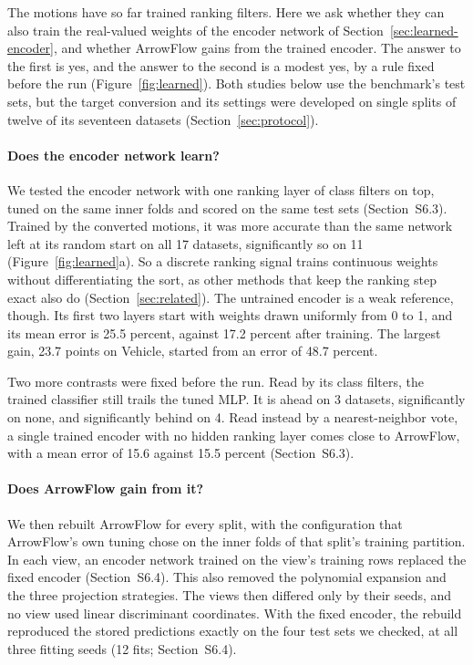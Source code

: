 The motions have so far trained ranking filters. Here we ask whether they can also train the real-valued weights of the encoder network of Section~\ref{sec:learned-encoder}, and whether ArrowFlow gains from the trained encoder. The answer to the first is yes, and the answer to the second is a modest yes, by a rule fixed before the run (Figure~\ref{fig:learned}). Both studies below use the benchmark's test sets, but the target conversion and its settings were developed on single splits of twelve of its seventeen datasets (Section~\ref{sec:protocol}).



\paragraph{Does the encoder network learn?} We tested the encoder network with one ranking layer of class filters on top, tuned on the same inner folds and scored on the same test sets (Section~S6.3). Trained by the converted motions, it was more accurate than the same network left at its random start on all 17 datasets, significantly so on 11 (Figure~\ref{fig:learned}a). So a discrete ranking signal trains continuous weights without differentiating the sort, as other methods that keep the ranking step exact also do (Section~\ref{sec:related}). The untrained encoder is a weak reference, though. Its first two layers start with weights drawn uniformly from 0 to 1, and its mean error is 25.5 percent, against 17.2 percent after training. The largest gain, 23.7 points on Vehicle, started from an error of 48.7 percent.

Two more contrasts were fixed before the run. Read by its class filters, the trained classifier still trails the tuned MLP. It is ahead on 3 datasets, significantly on none, and significantly behind on 4. Read instead by a nearest-neighbor vote, a single trained encoder with no hidden ranking layer comes close to ArrowFlow, with a mean error of 15.6 against 15.5 percent (Section~S6.3).

\paragraph{Does ArrowFlow gain from it?} We then rebuilt ArrowFlow for every split, with the configuration that ArrowFlow's own tuning chose on the inner folds of that split's training partition. In each view, an encoder network trained on the view's training rows replaced the fixed encoder (Section~S6.4). This also removed the polynomial expansion and the three projection strategies. The views then differed only by their seeds, and no view used linear discriminant coordinates. With the fixed encoder, the rebuild reproduced the stored predictions exactly on the four test sets we checked, at all three fitting seeds (12 fits; Section~S6.4).

